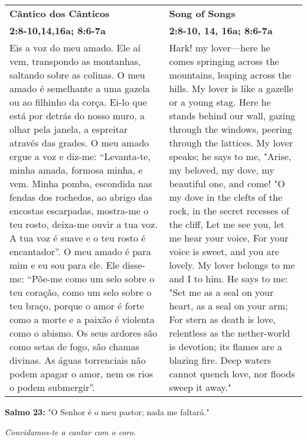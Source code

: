 \newpage


\begin{longtable}{p{1.7in}p{1.7in}}

  {\bf Cântico dos Cânticos} & \hfill{\bf Song of Songs}\\
  {\bf 2:8-10,14,16a; 8:6-7a} &  \hfill{\bf 2:8-10, 14, 16a; 8:6-7a}\\

Eis a voz do meu amado. Ele aí vem, transpondo as montanhas, saltando sobre as colinas. O meu amado é semelhante a uma gazela ou ao filhinho da corça. Ei-lo que está por detrás do nosso muro, a olhar pela janela, a espreitar através das grades.
O meu amado ergue a voz e diz-me: “Levanta-te, minha amada, formosa minha, e vem. Minha pomba, escondida nas fendas dos rochedos, ao abrigo das encostas escarpadas, mostra-me o teu rosto, deixa-me ouvir a tua voz. A tua voz é suave e o teu rosto é encantador”.
O meu amado é para mim e eu sou para ele.
Ele disse-me: “Põe-me como um selo sobre o teu coração, como um selo sobre o teu braço, porque o amor é forte como a morte e a paixão é violenta como o abismo. Os seus ardores são como setas de fogo, são chamas divinas. As águas torrenciais não podem apagar o amor, nem os rios o podem submergir”.

&
  
  
Hark! my lover—here he comes springing across the
mountains, leaping across the hills.
My lover is like a gazelle or a young stag.
Here he stands behind our wall, gazing through the windows,
peering through the lattices.
My lover speaks; he says to me,
"Arise, my beloved, my dove, my beautiful one, and come!
"O my dove in the clefts of the rock, in the secret
recesses of the cliff,
Let me see you, let me hear your voice,
For your voice is sweet, and you are lovely.
My lover belongs to me and I to him.
He says to me:
"Set me as a seal on your heart, as a seal on your arm;
For stern as death is love, relentless as the nether-world is
devotion; its flames are a blazing fire. Deep waters cannot
quench love, nor floods sweep it away."

\end{longtable}

\newpage



{\bf Salmo 23:} "O Senhor é o meu pastor; nada me faltará." 

{\it Convidamos-te a cantar com o coro.}

